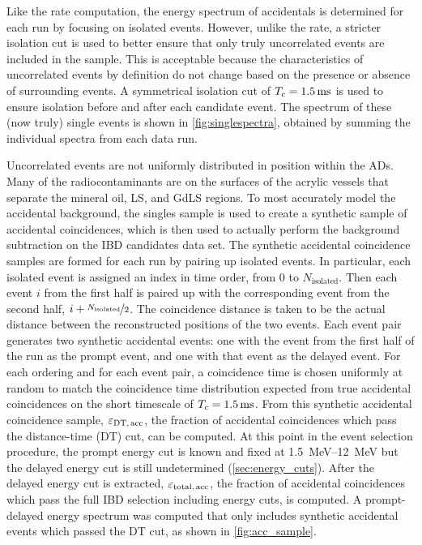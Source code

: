 Like the rate computation, the energy spectrum of accidentals is determined for each run
by focusing on isolated events.
However, unlike the rate, a stricter isolation cut is used
to better ensure that only truly uncorrelated events are included in the sample.
This is acceptable because the characteristics of uncorrelated events
by definition do not change based on the presence or absence
of surrounding events.
A symmetrical isolation cut of $T_c=\SI{1.5}{\milli\second}$ is used
to ensure isolation before and after each candidate event.
The spectrum of these (now truly) single events is shown in \cref{fig:singlespectra},
obtained by summing the individual spectra from each data run.


Uncorrelated events are not uniformly distributed
in position within the ADs.
Many of the radiocontaminants are on the surfaces of the
acrylic vessels that separate the mineral oil, LS, and GdLS regions.
To most accurately model the accidental background,
the singles sample is used to create a synthetic sample of accidental coincidences,
which is then used to actually perform the background subtraction
on the IBD candidates data set.
The synthetic accidental coincidence samples are formed for each run
by pairing up isolated events.
In particular, each isolated event is assigned an index in time order,
from $0$ to $N_{\text{isolated}}$.
Then each event $i$ from the first half is paired up with
the corresponding event from the second half, $i + \nicefrac{N_{\text{isolated}}}{2}$.
The coincidence distance is taken to be the actual distance
between the reconstructed positions of the two events.
Each event pair generates two synthetic accidental events:
one with the event from the first half of the run as the prompt event,
and one with that event as the delayed event.
For each ordering and for each event pair, a coincidence time is chosen
uniformly at random to match the coincidence time distribution
expected from true accidental coincidences on the short timescale
of $T_c=\SI{1.5}{\milli\second}$.
From this synthetic accidental coincidence sample, $\varepsilon_{\text{DT,\,acc}}$,
the fraction of accidental  coincidences which pass the distance-time (DT) cut,
can be computed.
At this point in the event selection procedure,
the prompt energy cut is known and fixed at \SIrange{1.5}{12}{\MeV}
but the delayed energy cut is still undetermined (\cref{sec:energy_cuts}).
After the delayed energy cut is extracted, $\varepsilon_{\text{total,\,acc}}$,
the fraction of accidental  coincidences
which pass the full IBD selection including energy cuts,
is computed.
A prompt-delayed energy spectrum was computed that only includes
synthetic accidental events which passed the DT cut,
as shown in \cref{fig:acc_sample}.

